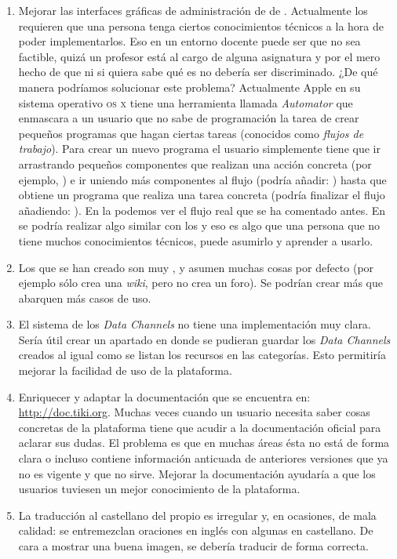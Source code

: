 \begin{enumerate}

\item Mejorar las interfaces gráficas de administración de \profiles{} de \tiki{}. Actualmente los \profiles{} requieren que una persona tenga ciertos conocimientos técnicos a la hora de poder implementarlos. Eso en un entorno docente puede ser que no sea factible, quizá un profesor está al cargo de alguna asignatura y por el mero hecho de que ni si quiera sabe qué es \yaml{} no debería ser discriminado. ¿De qué manera podríamos solucionar este problema? Actualmente Apple \cite{web:apple} en su sistema operativo \textsc{os x} \cite{web:apple-os-x} tiene una herramienta llamada \textit{Automator} \cite{web:apple-automator} que enmascara a un usuario que no sabe de programación la tarea de crear pequeños programas que hagan ciertas tareas (conocidos como \textit{flujos de trabajo}). Para crear un nuevo programa el usuario simplemente tiene que ir arrastrando pequeños componentes que realizan una acción concreta (por ejemplo, ) e ir uniendo más componentes al flujo (podría añadir: ) hasta que obtiene un programa que realiza una tarea concreta (podría finalizar el flujo añadiendo: ). En la  podemos ver el flujo real que se ha comentado antes. En \tiki{} se podría realizar algo similar con los \profiles{} y eso es algo que una persona que no tiene muchos conocimientos técnicos, puede asumirlo y aprender a usarlo.

\item Los \profiles{} que se han creado son muy , y asumen muchas cosas por defecto (por ejemplo sólo crea una \textit{wiki}, pero no crea un foro). Se podrían crear más \profiles{} que abarquen más casos de uso.

\item El sistema de los \textit{Data Channels} no tiene una implementación muy clara. Sería útil crear un apartado en \tiki{} donde se pudieran guardar los \textit{Data Channels} creados al igual como se listan los recursos en las categorías. Esto permitiría mejorar la facilidad de uso de la plataforma.

\item Enriquecer y adaptar la documentación que se encuentra en: \url{http://doc.tiki.org}. Muchas veces cuando un usuario necesita saber cosas concretas de la plataforma tiene que acudir a la documentación oficial para aclarar sus dudas. El problema es que en muchas áreas ésta no está de forma clara o incluso contiene información anticuada de anteriores versiones que ya no es vigente y que no sirve. Mejorar la documentación ayudaría a que los usuarios tuviesen un mejor conocimiento de la plataforma.

\item La traducción al castellano del propio \tiki{} es irregular y, en ocasiones, de mala calidad: se entremezclan oraciones en inglés con algunas en castellano. De cara a mostrar una buena imagen, se debería traducir de forma correcta.
\end{enumerate}

